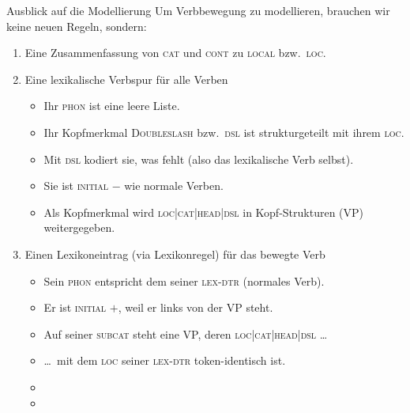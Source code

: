 \begin{frame}
  {Ausblick auf die Modellierung}
  \onslide<+->
  Um \alert{Verbbewegung} zu modellieren, brauchen wir keine neuen Regeln, sondern:\\
  \Halbzeile
  \begin{enumerate}[<+->]
    \item Eine Zusammenfassung von \textsc{cat} und \textsc{cont} zu \alert{\textsc{local}} bzw.\ \alert{\textsc{loc}}.
    \Viertelzeile
    \item Eine \alert{lexikalische Verbspur} für alle Verben
      \begin{itemize}[<+->]
        \item Ihr \textsc{phon} ist eine leere Liste.
        \item Ihr Kopfmerkmal \textsc{Doubleslash} bzw.\ \alert{\textsc{dsl} ist strukturgeteilt mit ihrem \textsc{loc}}.
        \item Mit \textsc{dsl} kodiert sie, was fehlt (also das lexikalische Verb selbst).
        \item Sie ist \textsc{initial $-$} wie normale Verben.
        \item Als Kopfmerkmal wird \textsc{loc|cat|head|dsl} in Kopf-Strukturen (VP) weitergegeben.
      \end{itemize}
      \Viertelzeile
    \item Einen Lexikoneintrag (via \alert{Lexikonregel) für das bewegte Verb}
      \begin{itemize}[<+->]
        \item Sein \textsc{phon} entspricht dem seiner \textsc{lex-dtr} (normales Verb).
        \item Er ist \textsc{initial $+$}, weil er links von der VP steht.
        \item Auf seiner \textsc{subcat} steht eine VP, deren \textsc{loc|cat|head|dsl} \ldots
        \item \ldots\ mit dem \textsc{loc} seiner \textsc{lex-dtr} token-identisch ist.
        \item {}
        \item {}
      \end{itemize}
  \end{enumerate}
\end{frame}

